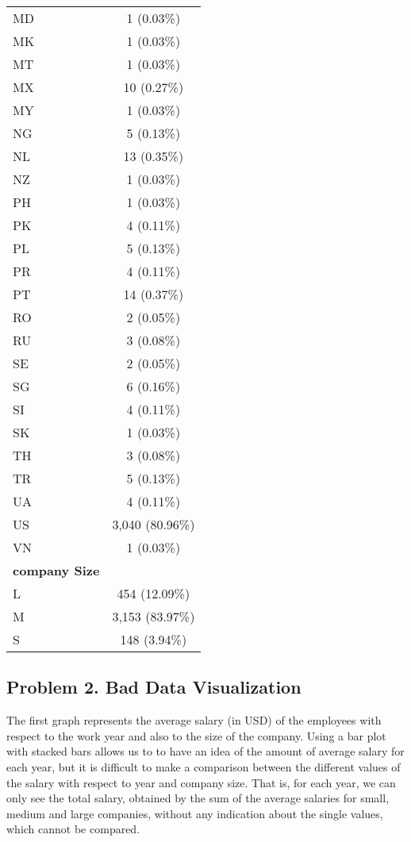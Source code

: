 \documentclass[
]{article}
\begin{document}
\begin{longtable}[]{@{}lc@{}}
MD & 1 (0.03\%) \\
MK & 1 (0.03\%) \\
MT & 1 (0.03\%) \\
MX & 10 (0.27\%) \\
MY & 1 (0.03\%) \\
NG & 5 (0.13\%) \\
NL & 13 (0.35\%) \\
NZ & 1 (0.03\%) \\
PH & 1 (0.03\%) \\
PK & 4 (0.11\%) \\
PL & 5 (0.13\%) \\
PR & 4 (0.11\%) \\
PT & 14 (0.37\%) \\
RO & 2 (0.05\%) \\
RU & 3 (0.08\%) \\
SE & 2 (0.05\%) \\
SG & 6 (0.16\%) \\
SI & 4 (0.11\%) \\
SK & 1 (0.03\%) \\
TH & 3 (0.08\%) \\
TR & 5 (0.13\%) \\
UA & 4 (0.11\%) \\
US & 3,040 (80.96\%) \\
VN & 1 (0.03\%) \\
\textbf{company Size} & \\
L & 454 (12.09\%) \\
M & 3,153 (83.97\%) \\
S & 148 (3.94\%) \\
\end{longtable}

\hypertarget{problem-2.-bad-data-visualization}{%
\subsection{Problem 2. Bad Data
Visualization}\label{problem-2.-bad-data-visualization}}

The first graph represents the average salary (in USD) of the employees
with respect to the work year and also to the size of the company. Using
a bar plot with stacked bars allows us to to have an idea of the amount
of average salary for each year, but it is difficult to make a
comparison between the different values of the salary with respect to
year and company size. That is, for each year, we can only see the total
salary, obtained by the sum of the average salaries for small, medium
and large companies, without any indication about the single values,
which cannot be compared. \newline
\end{document}
